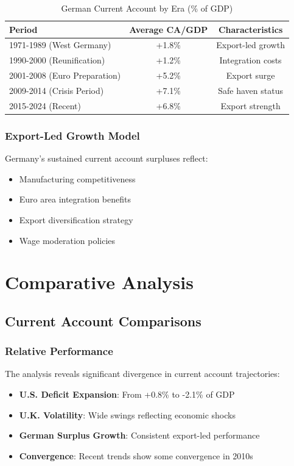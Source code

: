 \documentclass[11pt,a4paper]{article}
\begin{document}
\begin{table}[h]
\centering
\caption{German Current Account by Era (\% of GDP)}
\begin{tabular}{lcc}
\toprule
\textbf{Period} & \textbf{Average CA/GDP} & \textbf{Characteristics} \\
\midrule
1971-1989 (West Germany) & +1.8\% & Export-led growth \\
1990-2000 (Reunification) & +1.2\% & Integration costs \\
2001-2008 (Euro Preparation) & +5.2\% & Export surge \\
2009-2014 (Crisis Period) & +7.1\% & Safe haven status \\
2015-2024 (Recent) & +6.8\% & Export strength \\
\bottomrule
\end{tabular}
\end{table}

\subsubsection{Export-Led Growth Model}
Germany's sustained current account surpluses reflect:
\begin{itemize}
    \item Manufacturing competitiveness
    \item Euro area integration benefits
    \item Export diversification strategy
    \item Wage moderation policies
\end{itemize}

\section{Comparative Analysis}

\subsection{Current Account Comparisons}

\subsubsection{Relative Performance}
The analysis reveals significant divergence in current account trajectories:

\begin{itemize}
    \item \textbf{U.S. Deficit Expansion}: From +0.8\% to -2.1\% of GDP
    \item \textbf{U.K. Volatility}: Wide swings reflecting economic shocks
    \item \textbf{German Surplus Growth}: Consistent export-led performance
    \item \textbf{Convergence}: Recent trends show some convergence in 2010s
\end{itemize}
\end{document}
